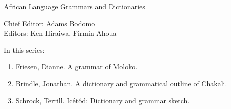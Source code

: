{\large African Language Grammars and Dictionaries}

\bigskip

Chief Editor:    Adams Bodomo \\
Editors:    Ken Hiraiwa,    Firmin Ahoua 

\bigskip

In this series:

\begin{enumerate}
\item Friesen, Dianne. A grammar of Moloko.
\item Brindle, Jonathan. A dictionary and grammatical outline of Chakali.
\item Schrock, Terrill. Icétôd: Dictionary and grammar sketch.
\end{enumerate}


\vfill

